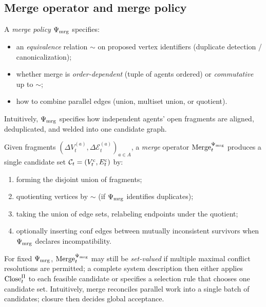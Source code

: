 \subsection{Merge operator and merge policy}
\label{sec:op-merge}

\begin{definition}
\label{def:merge-policy}
A \emph{merge policy} $\Psi_{\mathrm{mrg}}$ specifies:
\begin{itemize}[leftmargin=*]
  \item an \emph{equivalence} relation $\sim$ on proposed vertex identifiers (duplicate detection / canonicalization);
  \item whether merge is \emph{order-dependent} (tuple of agents ordered) or \emph{commutative} up to $\sim$;
  \item how to combine parallel edges (union, multiset union, or quotient).
\end{itemize}
Intuitively, $\Psi_{\mathrm{mrg}}$ specifies how independent agents' open fragments are aligned, deduplicated, and welded into one candidate graph.
\end{definition}

\begin{definition}
\label{def:merge-op}
Given fragments $(\Delta V^{(a)}_t,\Delta \mathcal{E}^{(a)}_t)_{a\in A}$, a \emph{merge} operator $\mathrm{Merge}_t^{\Psi_{\mathrm{mrg}}}$ produces a single candidate set $\mathcal{C}_t=(V^{\mathrm{c}}_t,E^{\mathrm{c}}_t)$ by:
\begin{enumerate}[label=\arabic*.,leftmargin=*]
  \item forming the disjoint union of fragments;
  \item quotienting vertices by $\sim$ (if $\Psi_{\mathrm{mrg}}$ identifies duplicates);
  \item taking the union of edge sets, relabeling endpoints under the quotient;
  \item optionally inserting $\mathrm{conf}$ edges between mutually inconsistent survivors when $\Psi_{\mathrm{mrg}}$ declares incompatibility.
\end{enumerate}
For fixed $\Psi_{\mathrm{mrg}}$, $\mathrm{Merge}_t^{\Psi_{\mathrm{mrg}}}$ may still be \emph{set-valued} if multiple maximal conflict resolutions are permitted; a complete system description then either applies $\mathrm{Close}_t^{\Pi}$ to each feasible candidate or specifies a selection rule that chooses one candidate set.
Intuitively, merge reconciles parallel work into a single batch of candidates; closure then decides global acceptance.
\end{definition}

